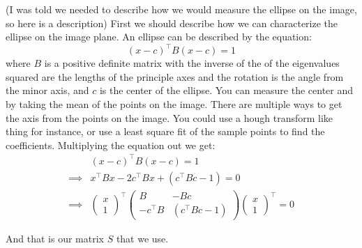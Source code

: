 \documentclass[11pt,english]{article}
\newcommand{\vect}[2]{\begin{pmatrix} #1 \\ #2 \end{pmatrix}}
\begin{document}
\begin{enumerate}
(I was told we needed to describe how we would measure the ellipse on the image, so here is a description)
First we should describe how we can characterize the ellipse on the image plane. An ellipse can be described by the
equation:
\[ (x - c)^\top B (x - c) = 1 \]
where $B$ is a positive definite matrix with the inverse of the of the eigenvalues squared are the lengths of the
principle axes and the rotation is the angle from the minor axis, and $c$ is the center of the ellipse.
You can measure the center and by taking the mean of the points on the image. There are multiple ways to get the axis
from the points on the image. You could use a hough transform like thing for instance, or use a least square fit of
the sample points to find the coefficients.  
Multiplying the equation out we get:
\begin{align*}
& (x - c)^\top B (x - c) = 1 \\
\implies & x^\top B x - 2 c^\top B x + (c^\top B c - 1) = 0 \\
\implies & \vect{x}{1}^\top \begin{pmatrix}
      B    &      -Bc         \\
 -c^\top B & (c^\top B c - 1)
\end{pmatrix} \vect{x}{1}^\top = 0
\end{align*}

And that is our matrix $S$ that we use.




\end{enumerate}
\end{document}
